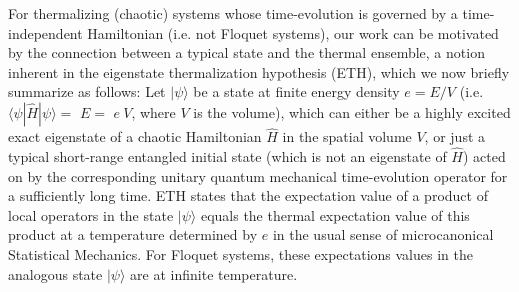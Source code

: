 \documentclass[aps,prb,preprint,onecolumn,amsmath,amssymb,superscriptaddress,eqsecnum,floatfix,scrartcl]{revtex4-1}
\begin{document}
For thermalizing (chaotic) systems whose time-evolution is governed by a time-independent Hamiltonian (i.e. not Floquet systems),
 our work can be motivated by
 the connection
 between a typical state and the thermal ensemble, a notion  inherent  in the eigenstate thermalization hypothesis\cite{Srednicki1994,Deutsch1991}
 (ETH),
which we now  briefly summarize as follows: 
Let $|\psi\rangle$ be a state at finite energy density $e=E/V$ (i.e. 
$\langle \psi| {\hat H} | \psi \rangle=$  $E=$ $ e \ V$,
where $V$ is the volume), which can
either be  a highly excited  exact eigenstate of a chaotic Hamiltonian ${\hat H}$ in the spatial volume $V$, or just 
a typical  short-range entangled  initial state  (which is not an eigenstate of ${\hat H}$) 
acted on by the corresponding unitary quantum mechanical  time-evolution operator for a sufficiently long time. ETH states that the expectation value of a product of local operators in the state $|\psi\rangle$ equals the thermal expectation value of this product 
at a temperature determined by $e$ in the usual sense of microcanonical Statistical Mechanics.
For Floquet systems, these expectations
values in the analogous state $|\psi\rangle$ are at infinite temperature.
\end{document}
